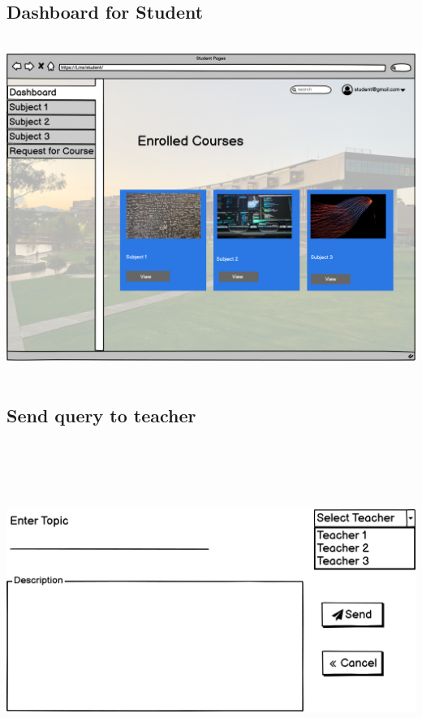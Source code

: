 \subsection{Dashboard for Student}

\includegraphics[width=18cm, height=11cm]{HW_1/images/Student Form.png}

\subsection{Send query to teacher}

\includegraphics[width=18cm, height=11cm]{HW_1/images/Student Form_2.png}

